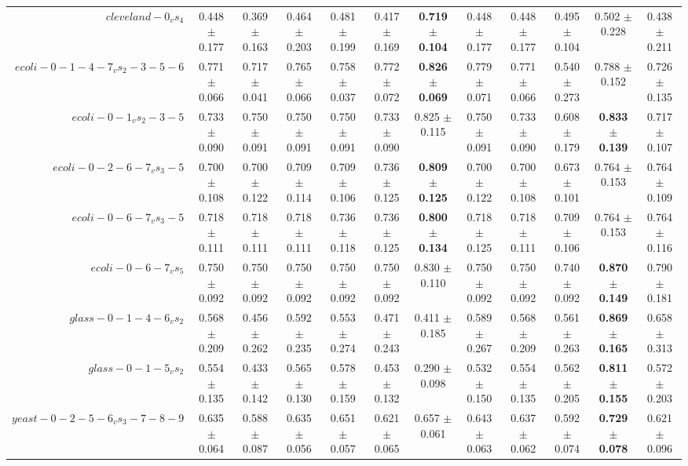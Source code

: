 \begin{table}[!ht]
{\begin{tabular}{r c c c c c c c c c c c}
$cleveland-0_vs_4$ & 0.448 $\pm$ 0.177 & 0.369 $\pm$ 0.163 & 0.464 $\pm$ 0.203 & 0.481 $\pm$ 0.199 & 0.417 $\pm$ 0.169 & \textbf{0.719 $\pm$ 0.104} & 0.448 $\pm$ 0.177 & 0.448 $\pm$ 0.177 & 0.495 $\pm$ 0.104 & 0.502 $\pm$ 0.228 & 0.438 $\pm$ 0.211 \\
$ecoli-0-1-4-7_vs_2-3-5-6$ & 0.771 $\pm$ 0.066 & 0.717 $\pm$ 0.041 & 0.765 $\pm$ 0.066 & 0.758 $\pm$ 0.037 & 0.772 $\pm$ 0.072 & \textbf{0.826 $\pm$ 0.069} & 0.779 $\pm$ 0.071 & 0.771 $\pm$ 0.066 & 0.540 $\pm$ 0.273 & 0.788 $\pm$ 0.152 & 0.726 $\pm$ 0.135 \\
$ecoli-0-1_vs_2-3-5$ & 0.733 $\pm$ 0.090 & 0.750 $\pm$ 0.091 & 0.750 $\pm$ 0.091 & 0.750 $\pm$ 0.091 & 0.733 $\pm$ 0.090 & 0.825 $\pm$ 0.115 & 0.750 $\pm$ 0.091 & 0.733 $\pm$ 0.090 & 0.608 $\pm$ 0.179 & \textbf{0.833 $\pm$ 0.139} & 0.717 $\pm$ 0.107 \\
$ecoli-0-2-6-7_vs_3-5$ & 0.700 $\pm$ 0.108 & 0.700 $\pm$ 0.122 & 0.709 $\pm$ 0.114 & 0.709 $\pm$ 0.106 & 0.736 $\pm$ 0.125 & \textbf{0.809 $\pm$ 0.125} & 0.700 $\pm$ 0.122 & 0.700 $\pm$ 0.108 & 0.673 $\pm$ 0.101 & 0.764 $\pm$ 0.153 & 0.764 $\pm$ 0.109 \\
$ecoli-0-6-7_vs_3-5$ & 0.718 $\pm$ 0.111 & 0.718 $\pm$ 0.111 & 0.718 $\pm$ 0.111 & 0.736 $\pm$ 0.118 & 0.736 $\pm$ 0.125 & \textbf{0.800 $\pm$ 0.134} & 0.718 $\pm$ 0.125 & 0.718 $\pm$ 0.111 & 0.709 $\pm$ 0.106 & 0.764 $\pm$ 0.153 & 0.764 $\pm$ 0.116 \\
$ecoli-0-6-7_vs_5$ & 0.750 $\pm$ 0.092 & 0.750 $\pm$ 0.092 & 0.750 $\pm$ 0.092 & 0.750 $\pm$ 0.092 & 0.750 $\pm$ 0.092 & 0.830 $\pm$ 0.110 & 0.750 $\pm$ 0.092 & 0.750 $\pm$ 0.092 & 0.740 $\pm$ 0.092 & \textbf{0.870 $\pm$ 0.149} & 0.790 $\pm$ 0.181 \\
$glass-0-1-4-6_vs_2$ & 0.568 $\pm$ 0.209 & 0.456 $\pm$ 0.262 & 0.592 $\pm$ 0.235 & 0.553 $\pm$ 0.274 & 0.471 $\pm$ 0.243 & 0.411 $\pm$ 0.185 & 0.589 $\pm$ 0.267 & 0.568 $\pm$ 0.209 & 0.561 $\pm$ 0.263 & \textbf{0.869 $\pm$ 0.165} & 0.658 $\pm$ 0.313 \\
$glass-0-1-5_vs_2$ & 0.554 $\pm$ 0.135 & 0.433 $\pm$ 0.142 & 0.565 $\pm$ 0.130 & 0.578 $\pm$ 0.159 & 0.453 $\pm$ 0.132 & 0.290 $\pm$ 0.098 & 0.532 $\pm$ 0.150 & 0.554 $\pm$ 0.135 & 0.562 $\pm$ 0.205 & \textbf{0.811 $\pm$ 0.155} & 0.572 $\pm$ 0.203 \\
$yeast-0-2-5-6_vs_3-7-8-9$ & 0.635 $\pm$ 0.064 & 0.588 $\pm$ 0.087 & 0.635 $\pm$ 0.056 & 0.651 $\pm$ 0.057 & 0.621 $\pm$ 0.065 & 0.657 $\pm$ 0.061 & 0.643 $\pm$ 0.063 & 0.637 $\pm$ 0.062 & 0.592 $\pm$ 0.074 & \textbf{0.729 $\pm$ 0.078} & 0.621 $\pm$ 0.096 \\

\end{tabular}}
\end{table}
